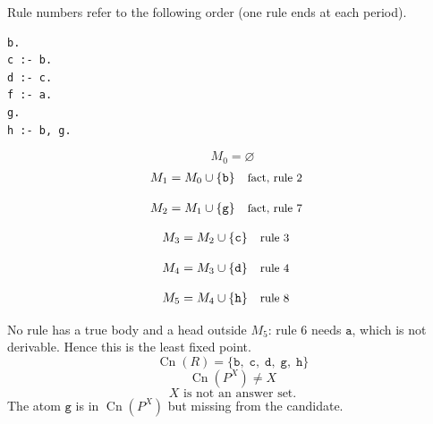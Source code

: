 \documentclass[a4paper,11pt]{article}
\newif\ifexplain
\newcommand{\explain}[1]{\ifexplain\begin{erklbox}#1\end{erklbox}\fi}
\newcommand{\why}[1]{\text{\small #1}}
\newcommand{\at}[1]{\texttt{#1}}
\begin{document}
Rule numbers refer to the following order (one rule ends at each period).
\begin{small}
\begin{verbatim}
b.
c :- b.
d :- c.
f :- a.
g.
h :- b, g.
\end{verbatim}
\end{small}
\explain{Beim Redukt bleibt die Kandidatenmenge fest. Wir entscheiden zuerst, welche Regeln wegfallen. Erst danach berechnen wir aus den verbleibenden positiven Regeln die kleinste abgeschlossene Menge. Ein Modell allein reicht nicht: Diese Menge muss genau der Kandidat sein.}
\[
M_0=\varnothing
\]
\begin{align*}
M_{1} &= M_{0}\cup \{\at{b}\} && \why{fact, rule 2}
\end{align*}
\explain{Diese Regel hat keinen Körper. Ihr Kopf $\at{b}$ ist damit ein Fakt und muss in die Menge.}
\begin{align*}
M_{2} &= M_{1}\cup \{\at{g}\} && \why{fact, rule 7}
\end{align*}
\explain{Diese Regel hat keinen Körper. Ihr Kopf $\at{g}$ ist damit ein Fakt und muss in die Menge.}
\begin{align*}
M_{3} &= M_{2}\cup \{\at{c}\} && \why{rule 3}
\end{align*}
\explain{Für $\at{c}$ brauchen wir $\at{b}$. Weil diese Voraussetzung bereits hergeleitet ist, dürfen wir den Regelkopf jetzt aufnehmen und alle bisherigen Atome behalten; bei einer fehlenden Voraussetzung würde diese Regel dagegen noch nichts beitragen.}
\begin{align*}
M_{4} &= M_{3}\cup \{\at{d}\} && \why{rule 4}
\end{align*}
\explain{Für $\at{d}$ brauchen wir $\at{c}$. Weil diese Voraussetzung bereits hergeleitet ist, dürfen wir den Regelkopf jetzt aufnehmen und alle bisherigen Atome behalten; bei einer fehlenden Voraussetzung würde diese Regel dagegen noch nichts beitragen.}
\begin{align*}
M_{5} &= M_{4}\cup \{\at{h}\} && \why{rule 8}
\end{align*}
\explain{Für $\at{h}$ brauchen wir $\at{b}$ und $\at{g}$. Weil diese Voraussetzungen bereits hergeleitet sind, dürfen wir den Regelkopf jetzt aufnehmen und alle bisherigen Atome behalten; bei einer fehlenden Voraussetzung würde diese Regel dagegen noch nichts beitragen.}
No rule has a true body and a head outside $M_{5}$: rule 6 needs $\at{a}$, which is not derivable. Hence this is the least fixed point.
\[
\operatorname{Cn}(R)=\{\at{b},\;\at{c},\;\at{d},\;\at{g},\;\at{h}\}
\]
\[
\operatorname{Cn}(P^X)\ne X
\]
\[
\boxed{X\text{ is not an answer set.}}
\]
The atom $\at{g}$ is in $\operatorname{Cn}(P^X)$ but missing from the candidate.
\explain{Der Fehler liegt nicht bei $\at{d}$: Das ist sauber über $\at{c}$ hergeleitet. Das Problem ist $\at{g}$ -- die Regel \texttt{g :- not f} bleibt im Redukt als Fact erhalten, weil $\at{f}$ nicht im Kandidaten ist, und zieht dann $\at{h}$ nach. Genau deshalb sind die negierten Streitpaare $\at{f}$ und $\at{g}$ beim Aufstellen des Kandidaten zu bedenken.}
\end{document}
